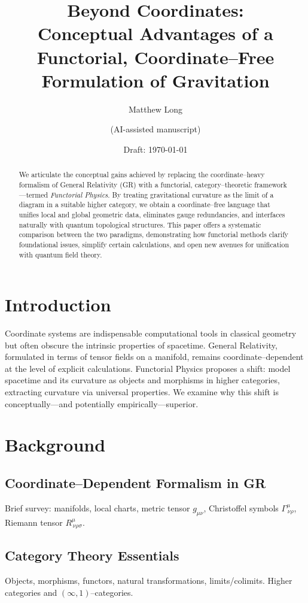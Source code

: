 \documentclass[11pt]{article}
\title{Beyond Coordinates:\\Conceptual Advantages of a Functorial, Coordinate--Free Formulation of Gravitation}
\author[1]{Matthew Long}
\author[2]{(AI-assisted manuscript)}
\affil[1]{Magneton Labs, USA}
\affil[2]{OpenAI ChatGPT o3}
\date{Draft: \today}
\begin{document}
\maketitle

\begin{abstract}
We articulate the conceptual gains achieved by replacing the coordinate--heavy formalism of General Relativity (GR) with a functorial, category--theoretic framework---termed \emph{Functorial Physics}. By treating gravitational curvature as the limit of a diagram in a suitable higher category, we obtain a coordinate--free language that unifies local and global geometric data, eliminates gauge redundancies, and interfaces naturally with quantum topological structures. This paper offers a systematic comparison between the two paradigms, demonstrating how functorial methods clarify foundational issues, simplify certain calculations, and open new avenues for unification with quantum field theory.
\end{abstract}

\tableofcontents

\section{Introduction}
Coordinate systems are indispensable computational tools in classical geometry but often obscure the intrinsic properties of spacetime. General Relativity, formulated in terms of tensor fields on a manifold, remains coordinate--dependent at the level of explicit calculations. Functorial Physics proposes a shift: model spacetime and its curvature as objects and morphisms in higher categories, extracting curvature via universal properties. We examine why this shift is conceptually---and potentially empirically---superior.

\section{Background}
\subsection{Coordinate--Dependent Formalism in GR}
Brief survey: manifolds, local charts, metric tensor $g_{\mu\nu}$, Christoffel symbols $\Gamma^{\mu}_{\,\nu\rho}$, Riemann tensor $R^{\mu}_{\,\nu\rho\sigma}$.
\subsection{Category Theory Essentials}
Objects, morphisms, functors, natural transformations, limits/colimits. Higher categories and $(\infty,1)$--categories.
\end{document}
